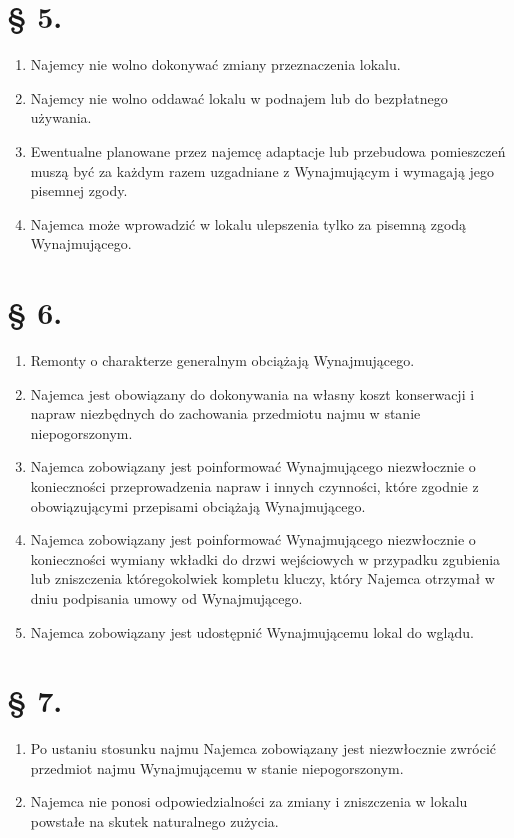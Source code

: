 \documentclass[a4paper,11pt, notitlepage]{article}
\begin{document}
\section*{§ 5.}
    \begin{enumerate}
        \item Najemcy nie wolno dokonywać zmiany przeznaczenia lokalu.
 	
        \item Najemcy nie wolno oddawać lokalu w podnajem lub do bezpłatnego używania.
 	
        \item Ewentualne planowane przez najemcę adaptacje lub przebudowa pomieszczeń muszą 	być za każdym razem uzgadniane z Wynajmującym i wymagają jego 	pisemnej zgody.
 	
        \item Najemca może wprowadzić w lokalu ulepszenia tylko za pisemną zgodą Wynajmującego.
    \end{enumerate}

    
\section*{§ 6.}
    \begin{enumerate}
        \item Remonty o charakterze generalnym obciążają Wynajmującego.
 	
        \item Najemca jest obowiązany do dokonywania na własny koszt konserwacji i napraw niezbędnych do zachowania przedmiotu najmu w stanie niepogorszonym.
 	
        \item Najemca zobowiązany jest poinformować Wynajmującego niezwłocznie o konieczności przeprowadzenia napraw i innych czynności, które zgodnie z obowiązującymi przepisami obciążają Wynajmującego.
 	
        \item Najemca zobowiązany jest poinformować Wynajmującego niezwłocznie o konieczności wymiany wkładki do drzwi wejściowych w przypadku 	zgubienia lub zniszczenia któregokolwiek kompletu kluczy, który Najemca otrzymał w dniu podpisania umowy od Wynajmującego.
 	
        \item Najemca zobowiązany jest udostępnić Wynajmującemu lokal do wglądu.
\end{enumerate}

    
\section*{§ 7.}
    \begin{enumerate}
        \item Po ustaniu stosunku najmu Najemca zobowiązany jest niezwłocznie zwrócić przedmiot najmu Wynajmującemu w stanie niepogorszonym.
 	
        \item Najemca nie ponosi odpowiedzialności za zmiany i zniszczenia w 	lokalu powstałe na skutek naturalnego zużycia.
    \end{enumerate}
\end{document}
